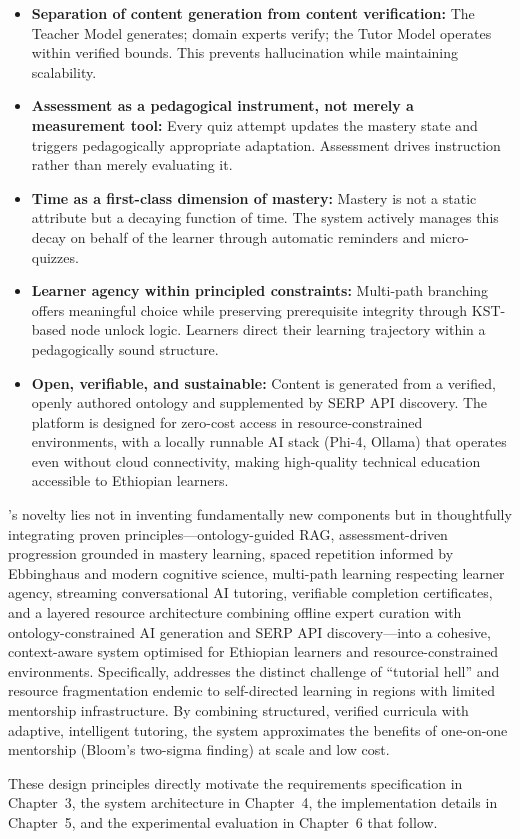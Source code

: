\begin{itemize}
    \item \textbf{Separation of content generation from content verification:} The Teacher Model generates; domain experts verify; the Tutor Model operates within verified bounds. This prevents hallucination while maintaining scalability.
    \item \textbf{Assessment as a pedagogical instrument, not merely a measurement tool:} Every quiz attempt updates the mastery state and triggers pedagogically appropriate adaptation. Assessment drives instruction rather than merely evaluating it.
    \item \textbf{Time as a first-class dimension of mastery:} Mastery is not a static attribute but a decaying function of time. The system actively manages this decay on behalf of the learner through automatic reminders and micro-quizzes.
    \item \textbf{Learner agency within principled constraints:} Multi-path branching offers meaningful choice while preserving prerequisite integrity through KST-based node unlock logic. Learners direct their learning trajectory within a pedagogically sound structure.
    \item \textbf{Open, verifiable, and sustainable:} Content is generated from a verified, openly authored ontology and supplemented by SERP API discovery. The platform is designed for zero-cost access in resource-constrained environments, with a locally runnable AI stack (Phi-4, Ollama) that operates even without cloud connectivity, making high-quality technical education accessible to Ethiopian learners.
\end{itemize}

\projectname's novelty lies not in inventing fundamentally new components but in thoughtfully integrating proven principles---ontology-guided RAG, assessment-driven progression grounded in mastery learning, spaced repetition informed by Ebbinghaus and modern cognitive science, multi-path learning respecting learner agency, streaming conversational AI tutoring, verifiable completion certificates, and a layered resource architecture combining offline expert curation with ontology-constrained AI generation and SERP API discovery---into a cohesive, context-aware system optimised for Ethiopian learners and resource-constrained environments. Specifically, \projectname{} addresses the distinct challenge of \enquote{tutorial hell} and resource fragmentation endemic to self-directed learning in regions with limited mentorship infrastructure. By combining structured, verified curricula with adaptive, intelligent tutoring, the system approximates the benefits of one-on-one mentorship (Bloom's two-sigma finding) at scale and low cost.

These design principles directly motivate the requirements specification in Chapter~3, the system architecture in Chapter~4, the implementation details in Chapter~5, and the experimental evaluation in Chapter~6 that follow.
